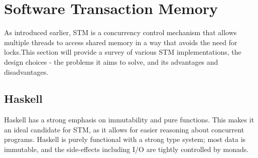 \section{Software Transaction Memory\label{sec:stm}}
As introduced earlier, STM is a concurrency control mechanism that allows multiple threads to access shared memory in a way that avoids the need for locks.This section will provide a survey of various STM implementations, the design choices - the problems it aims to solve, and its advantages and disadvantages.
\subsection{Haskell}
Haskell has a strong emphasis on immutability and pure functions. This makes it an ideal candidate for STM, as it allows for easier reasoning about concurrent programs.  Haskell is purely functional with a strong type system; most data is immutable, and the side-effects including I/O are tightly controlled by monads. 

